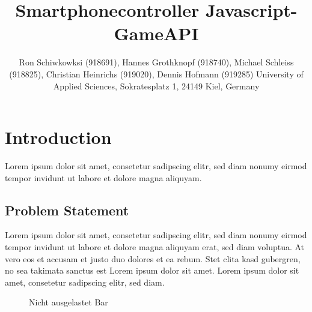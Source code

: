 \documentclass[a4paper]{spie}  %
\title{Smartphonecontroller Javascript-GameAPI}
\author{ Ron Schiwkowksi  (918691), Hannes Grothknopf (918740), Michael Schleiss (918825), Christian Heinrichs (919020), Dennis Hofmann (919285)
\skiplinehalf
University of Applied Sciences, Sokratesplatz 1, 24149 Kiel, Germany
}
\begin{document}
 
  \maketitle 
\begin{abstract}
\end{abstract}


\section{Introduction}
Lorem ipsum dolor sit amet, consetetur sadipscing elitr, sed diam nonumy eirmod tempor invidunt ut labore et dolore magna aliquyam.

\subsection{Problem Statement}
Lorem ipsum dolor sit amet, consetetur sadipscing elitr, sed diam nonumy eirmod tempor invidunt ut labore et dolore magna aliquyam erat, sed diam voluptua. At vero eos et accusam et justo duo dolores et ea rebum. Stet clita kasd gubergren, no sea takimata sanctus est Lorem ipsum dolor sit amet. Lorem ipsum dolor sit amet, consetetur sadipscing elitr, sed diam.
\begin{figure}[h!]
	\centering
		\caption{Nicht ausgelastet Bar}
		\label{fig:FrontendInit}
\end{figure}
\end{document}
